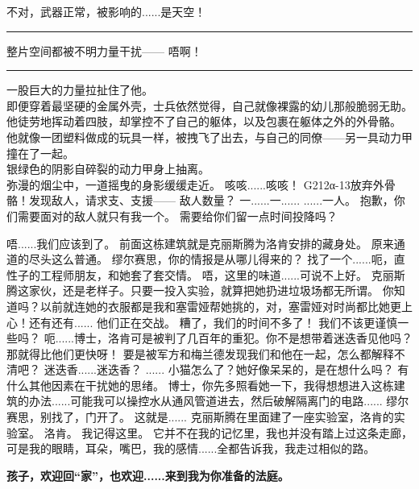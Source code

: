 \documentclass[openany]{book}
\begin{document}
\begin{dialogue}
     不对，武器正常，被影响的......是天空！
    \par\noindent\rule{\textwidth}{0.4pt}
     整片空间都被不明力量干扰——
     唔啊！
    \par\noindent\rule{\textwidth}{0.4pt}\par
    一股巨大的力量拉扯住了他。\\
    即便穿着最坚硬的金属外壳，士兵依然觉得，自己就像裸露的幼儿那般脆弱无助。\\
    他徒劳地挥动着四肢，却掌控不了自己的躯体，以及包裹在躯体之外的外骨骼。\\
    他就像一团塑料做成的玩具一样，被拽飞了出去，与自己的同僚——另一具动力甲撞在了一起。\\
    银绿色的阴影自碎裂的动力甲身上抽离。\\
    弥漫的烟尘中，一道摇曳的身影缓缓走近。
     咳咳......咳咳！
     G212α-13放弃外骨骼！发现敌人，请求支、支援——
     敌人数量？
     一......一......
     ......一人。
     抱歉，你们需要面对的敌人就只有我一个。
     需要给你们留一点时间投降吗？
\end{dialogue}

\begin{dialogue}
     唔......我们应该到了。
     前面这栋建筑就是克丽斯腾为洛肯安排的藏身处。
     原来通道的尽头这么普通。
     缪尔赛思，你的情报是从哪儿得来的？
     找了一个......呃，直性子的工程师朋友，和她套了套交情。
     唔，这里的味道......可说不上好。
     克丽斯腾这家伙，还是老样子。只要一投入实验，就算把她扔进垃圾场都无所谓。
     你知道吗？以前就连她的衣服都是我和塞雷娅帮她挑的，对，塞雷娅对时尚都比她更上心！还有还有......
     他们正在交战。
     糟了，我们的时间不多了！
     我们不该更谨慎一些吗？
     呃......博士，洛肯可是被判了几百年的重犯。你不是想带着迷迭香见他吗？那就得比他们更快呀！
     要是被军方和梅兰德发现我们和他在一起，怎么都解释不清吧？
     迷迭香......迷迭香？
     ......
     小猫怎么了？她好像呆呆的，是在想什么吗？
     有什么其他因素在干扰她的思绪。
     博士，你先多照看她一下，我得想想进入这栋建筑的办法......可能我可以操控水从通风管道进去，然后破解隔离门的电路......
     缪尔赛思，别找了，门开了。
     这就是......
     克丽斯腾在里面建了一座实验室，洛肯的实验室。
     洛肯。
     我记得这里。
     它并不在我的记忆里，我也并没有踏上过这条走廊，可是我的眼睛，耳朵，嘴巴，我的感情......全都告诉我，我走过相似的路。
\end{dialogue}
\begin{center} \textbf{孩子，欢迎回“家”，也欢迎......来到我为你准备的法庭。}\end{center}
\end{document}
